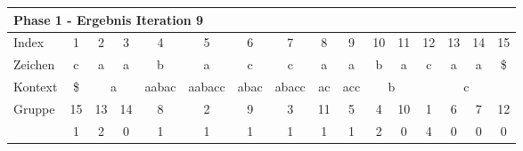 \begin{table}[H]
\centering
\begin{adjustbox}{max width=\textwidth}
\begin{tabular}{lccccccccccccccc}
\multicolumn{16}{l}{Phase 1 - Ergebnis Iteration 9}                                                                                                                                                                                                                                                                                                                                                 \\ \hline
\multicolumn{1}{l|}{Index}   & 1                       & \cellcolor[HTML]{\green}2 & \cellcolor[HTML]{\green}3 & 4                          & 5                           & 6                         & 7                          & 8                       & 9                        & 10 & 11                      & 12 & 13                        & 14                        & 15  \\
\multicolumn{1}{l|}{Zeichen} & c                       & a                         & a                         & b                          & a                           & c                         & c                          & a                       & a                        & b  & a                       & c  & a                         & a                         & \$  \\ \cline{1-16}
\multicolumn{1}{l|}{Kontext} & \multicolumn{1}{c|}{\$} & \multicolumn{2}{c|}{a}                                & \multicolumn{1}{c|}{aabac} & \multicolumn{1}{c|}{aabacc} & \multicolumn{1}{c|}{abac} & \multicolumn{1}{c|}{abacc} & \multicolumn{1}{c|}{ac} & \multicolumn{1}{c|}{acc} & \multicolumn{2}{c|}{b}       & \multicolumn{4}{c}{c}                                            \\
\multicolumn{1}{l|}{Gruppe}      & \multicolumn{1}{c|}{15} & 13                        & \multicolumn{1}{c|}{14}   & \multicolumn{1}{c|}{8}     & \multicolumn{1}{c|}{2}      & \multicolumn{1}{c|}{9}    & \multicolumn{1}{c|}{3}     & \multicolumn{1}{c|}{11} & \multicolumn{1}{c|}{5}   & 4  & \multicolumn{1}{c|}{10} & 1  & 6                         & 7                         & 12  \\
\multicolumn{1}{l|}{\gsize}   & \multicolumn{1}{c|}{1}  & 2                         & \multicolumn{1}{c|}{0}    & \multicolumn{1}{c|}{1}     & \multicolumn{1}{c|}{1}      & \multicolumn{1}{c|}{1}    & \multicolumn{1}{c|}{1}     & \multicolumn{1}{c|}{1}  & \multicolumn{1}{c|}{1}   & 2  & \multicolumn{1}{c|}{0}  & 4  & 0                         & 0                         & 0   \\

\end{tabular}
\end{adjustbox}
\end{table}
